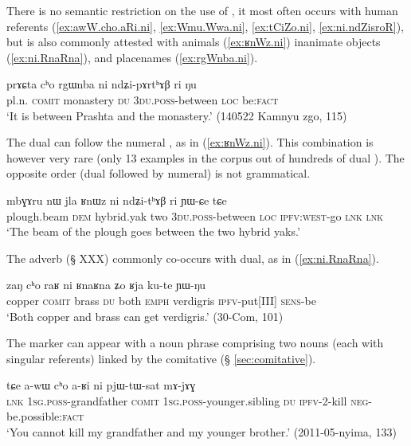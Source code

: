 There is no semantic restriction on the use of , it most often occurs with human referents (\ref{ex:awW.cho.aRi.ni}, \ref{ex:Wmu.Wwa.ni}, \ref{ex:tCiZo.ni}, \ref{ex:ni.ndZisroR}), but is also commonly attested with animals (\ref{ex:ʁnWz.ni}) inanimate objects (\ref{ex:ni.RnaRna}), and placenames (\ref{ex:rgWnba.ni}).

\begin{exe}
\ex \label{ex:rgWnba.ni}
\gll prɤɕta cʰo rgɯnba ni ndʑi-pɤrtʰɤβ ri ŋu \\
pl.n. \textsc{comit} monastery \textsc{du} \textsc{3du}.\textsc{poss}-between \textsc{loc} be:\textsc{fact} \\
\glt `It is between Prashta and the monastery.' (140522 Kamnyu zgo, 115)
\end{exe}

The dual can follow the numeral , as in (\ref{ex:ʁnWz.ni}). This combination is however very rare (only 13 examples in the corpus out of hundreds of dual ). The opposite order (dual followed by numeral) is not grammatical.

\begin{exe}
\ex \label{ex:ʁnWz.ni}
\gll mbɣɤru nɯ jla ʁnɯz ni ndʑi-tʰɤβ ri ɲɯ-ɕe tɕe \\
plough.beam \textsc{dem} hybrid.yak two \textsc{3du}.\textsc{poss}-between \textsc{loc} \textsc{ipfv}:\textsc{west}-go \textsc{lnk} \textsc{lnk} \\
\glt `The beam of the plough goes between the two hybrid yaks.' 
\end{exe}


The adverb  (§ XXX) commonly co-occurs with dual, as in (\ref{ex:ni.RnaRna}).

\begin{exe}
\ex \label{ex:ni.RnaRna}
\gll zaŋ cʰo raʁ ni ʁnaʁna ʑo ʁja ku-te ɲɯ-ŋu \\
copper \textsc{comit} brass \textsc{du} both \textsc{emph} verdigris \textsc{ipfv}-put[III] \textsc{sens}-be \\
\glt `Both copper and brass can get verdigris.' (30-Com, 101)
\end{exe}

The marker  can appear with a noun phrase comprising two nouns (each with singular referents) linked by the comitative  (§ \ref{sec:comitative}).

\begin{exe}
\ex \label{ex:awW.cho.aRi.ni}
\gll  tɕe a-wɯ cʰo a-ʁi ni pjɯ-tɯ-sat mɤ-jɤɣ \\
\textsc{lnk} \textsc{1sg}.\textsc{poss}-grandfather \textsc{comit} \textsc{1sg}.\textsc{poss}-younger.sibling \textsc{du} \textsc{ipfv}-2-kill \textsc{neg}-be.possible:\textsc{fact} \\
\glt `You cannot kill my grandfather and my younger brother.' (2011-05-nyima, 133)
\end{exe}

